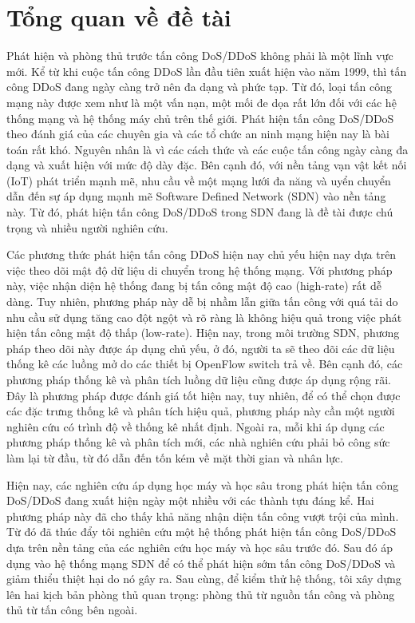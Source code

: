 \section{Tổng quan về đề tài}
Phát hiện và phòng thủ trước tấn công DoS/DDoS không phải là một lĩnh vực mới. Kể từ khi cuộc tấn công DDoS lần đầu tiên xuất hiện vào năm 1999, thì tấn công DDoS đang ngày càng trở nên đa dạng và phức tạp. Từ đó, loại tấn công mạng này được xem như là một vấn nạn, một mối đe dọa rất lớn đối với các hệ thống mạng và hệ thống máy chủ trên thế giới. Phát hiện tấn công DoS/DDoS theo đánh giá của các chuyên gia và các tổ chức an ninh mạng hiện nay là bài toán rất khó. Nguyên nhân là vì các cách thức và các cuộc tấn công ngày càng đa dạng và xuất hiện với mức độ dày đặc. Bên cạnh đó, với nền tảng vạn vật kết nối (IoT) phát triển mạnh mẽ, nhu cầu về một mạng lưới đa năng và uyển chuyển dẫn đến sự áp dụng mạnh mẽ Software Defined Network (SDN) vào nền tảng này. Từ đó, phát hiện tấn công DoS/DDoS trong SDN đang là đề tài được chú trọng và nhiều người nghiên cứu.

Các phương thức phát hiện tấn công DDoS hiện nay chủ yếu hiện nay dựa trên việc theo dõi mật độ dữ liệu di chuyển trong hệ thống mạng. Với phương pháp này, việc nhận diện hệ thống đang bị tấn công mật độ cao (high-rate) rất dễ dàng. Tuy nhiên, phương pháp này dễ bị nhầm lẫn giữa tấn công với quá tải do nhu cầu sử dụng tăng cao đột ngột và rõ ràng là không hiệu quả trong việc phát hiện tấn công mật độ thấp (low-rate). Hiện nay, trong môi trường SDN, phương pháp theo dõi này được áp dụng chủ yếu, ở đó, người ta sẽ theo dõi các dữ liệu thống kê các luồng mở do các thiết bị OpenFlow switch trả về. Bên cạnh đó, các phương pháp thống kê và phân tích luồng dữ liệu cũng được áp dụng rộng rãi. Đây là phương pháp được đánh giá tốt hiện nay, tuy nhiên, để có thể chọn được các đặc trưng thống kê và phân tích hiệu quả, phương pháp này cần một người nghiên cứu có trình độ về thống kê nhất định. Ngoài ra, mỗi khi áp dụng các phương pháp thống kê và phân tích mới, các nhà nghiên cứu phải bỏ công sức làm lại từ đầu, từ đó dẫn đến tốn kém về mặt thời gian và nhân lực. 

Hiện nay, các nghiên cứu áp dụng học máy và học sâu trong phát hiện tấn công DoS/DDoS đang xuất hiện ngày một nhiều với các thành tựu đáng kể. Hai phương pháp này đã cho thấy khả năng nhận diện tấn công vượt trội của mình. Từ đó đã thúc đẩy tôi nghiên cứu một hệ thống phát hiện tấn công DoS/DDoS dựa trên nền tảng của các nghiên cứu học máy và học sâu trước đó. Sau đó áp dụng vào hệ thống mạng SDN để có thể phát hiện sớm tấn công DoS/DDoS và giảm thiểu thiệt hại do nó gây ra. Sau cùng, để kiểm thử hệ thống, tôi xây dựng lên hai kịch bản phòng thủ quan trọng: phòng thủ từ nguồn tấn công và phòng thủ từ tấn công bên ngoài.

